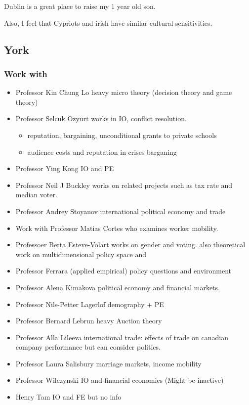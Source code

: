 \documentclass[12pt]{article}
\theoremstyle{plain}
\theoremstyle{plain}
\theoremstyle{plain}
\theoremstyle{plain}
\theoremstyle{plain}
\theoremstyle{plain}
\begin{document}
Dublin is a great place to raise my 1 year old son.

Also, I feel that Cypriots and irish have similar cultural sensitivities.

\subsection{York}
\label{sec:orgd102960}
\subsubsection{Work with}
\label{sec:orgca16364}
\begin{itemize}
\item Professor Kin Chung Lo heavy micro theory (decision theory and game theory)
\item Professor Selcuk Ozyurt works in IO, conflict resolution.
\begin{itemize}
\item reputation, bargaining, unconditional grants to private schools
\item audience costs and reputation in crises barganing
\end{itemize}
\item Professor Ying Kong IO and PE
\item Professor Neil J Buckley works on related projects such as tax rate and median voter.
\item Professor Andrey Stoyanov international political economy and trade
\item Work with Professor Matias Cortes who examines worker mobility.
\item Professoer Berta Esteve-Volart works on gender and voting. also theoretical work on multidimensional policy space and
\item Professor Ferrara (applied empirical) policy questions and environment
\item Professor Alena Kimakova political economy and financial markets.
\item Professor Nils-Petter Lagerlof demography + PE
\item Professor Bernard Lebrun heavy Auction theory
\item Professor Alla Lileeva international trade: effects of trade on canadian company performance but can consider politics.
\item Professor Laura Salisbury marriage markets, income mobility
\item Professor Wilczynski IO and financial economics (Might be inactive)
\item Henry Tam IO and FE but no info
\end{itemize}
\end{document}

